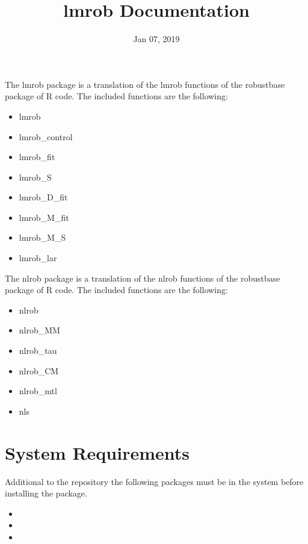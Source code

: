 \documentclass[letterpaper,10pt,english]{sphinxmanual}
\title{lmrob Documentation}
\date{Jan 07, 2019}
\author{}
\begin{document}
\maketitle
\sphinxtableofcontents
{}\label{\detokenize{index::doc}}


The lmrob package is a translation of the lmrob functions of the robustbase
package of R code. The included functions are the following:
\begin{itemize}
\item {} 
lmrob

\item {} 
lmrob\_control

\item {} 
lmrob\_fit

\item {} 
lmrob\_S

\item {} 
lmrob\_D\_fit

\item {} 
lmrob\_M\_fit

\item {} 
lmrob\_M\_S

\item {} 
lmrob\_lar

\end{itemize}

The nlrob package is a translation of the nlrob functions of the robustbase
package of R code. The included functions are the following:
\begin{itemize}
\item {} 
nlrob

\item {} 
nlrob\_MM

\item {} 
nlrob\_tau

\item {} 
nlrob\_CM

\item {} 
nlrob\_mtl

\item {} 
nls

\end{itemize}


\chapter{System Requirements}
\label{\detokenize{Installation:system-requirements}}\label{\detokenize{Installation:installation}}\label{\detokenize{Installation::doc}}
Additional to the repository the following packages must be in the system
before installing the package.
\begin{itemize}
\item {} 

\item {} 

\item {} 

\end{itemize}
\end{document}
